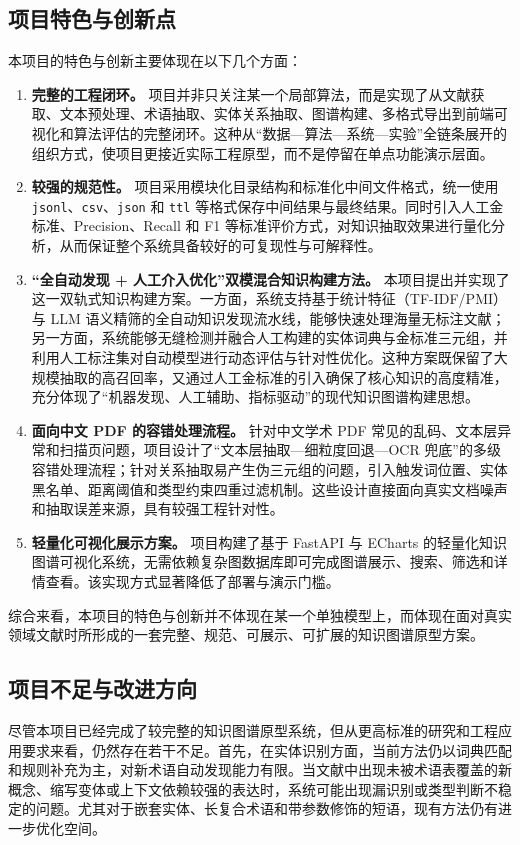 \subsection{项目特色与创新点}
本项目的特色与创新主要体现在以下几个方面：
\begin{enumerate}[leftmargin=2.2em,label=\arabic*.]
    \item \textbf{完整的工程闭环。} 项目并非只关注某一个局部算法，而是实现了从文献获取、文本预处理、术语抽取、实体关系抽取、图谱构建、多格式导出到前端可视化和算法评估的完整闭环。这种从“数据—算法—系统—实验”全链条展开的组织方式，使项目更接近实际工程原型，而不是停留在单点功能演示层面。
    \item \textbf{较强的规范性。} 项目采用模块化目录结构和标准化中间文件格式，统一使用 \texttt{jsonl}、\texttt{csv}、\texttt{json} 和 \texttt{ttl} 等格式保存中间结果与最终结果。同时引入人工金标准、Precision、Recall 和 F1 等标准评价方式，对知识抽取效果进行量化分析，从而保证整个系统具备较好的可复现性与可解释性。
    \item \textbf{“全自动发现 + 人工介入优化”双模混合知识构建方法。} 本项目提出并实现了这一双轨式知识构建方案。一方面，系统支持基于统计特征（TF-IDF/PMI）与 LLM 语义精筛的全自动知识发现流水线，能够快速处理海量无标注文献；另一方面，系统能够无缝检测并融合人工构建的实体词典与金标准三元组，并利用人工标注集对自动模型进行动态评估与针对性优化。这种方案既保留了大规模抽取的高召回率，又通过人工金标准的引入确保了核心知识的高度精准，充分体现了“机器发现、人工辅助、指标驱动”的现代知识图谱构建思想。
    \item \textbf{面向中文 PDF 的容错处理流程。} 针对中文学术 PDF 常见的乱码、文本层异常和扫描页问题，项目设计了“文本层抽取—细粒度回退—OCR 兜底”的多级容错处理流程；针对关系抽取易产生伪三元组的问题，引入触发词位置、实体黑名单、距离阈值和类型约束四重过滤机制。这些设计直接面向真实文档噪声和抽取误差来源，具有较强工程针对性。
    \item \textbf{轻量化可视化展示方案。} 项目构建了基于 FastAPI 与 ECharts 的轻量化知识图谱可视化系统，无需依赖复杂图数据库即可完成图谱展示、搜索、筛选和详情查看。该实现方式显著降低了部署与演示门槛。
\end{enumerate}
综合来看，本项目的特色与创新并不体现在某一个单独模型上，而体现在面对真实领域文献时所形成的一套完整、规范、可展示、可扩展的知识图谱原型方案。

\subsection{项目不足与改进方向}
尽管本项目已经完成了较完整的知识图谱原型系统，但从更高标准的研究和工程应用要求来看，仍然存在若干不足。首先，在实体识别方面，当前方法仍以词典匹配和规则补充为主，对新术语自动发现能力有限。当文献中出现未被术语表覆盖的新概念、缩写变体或上下文依赖较强的表达时，系统可能出现漏识别或类型判断不稳定的问题。尤其对于嵌套实体、长复合术语和带参数修饰的短语，现有方法仍有进一步优化空间。

